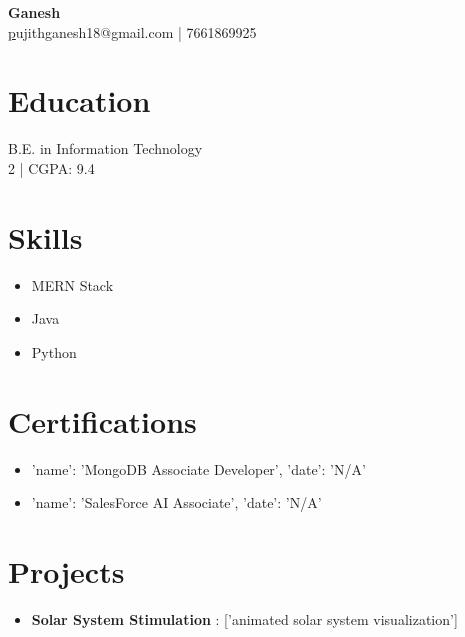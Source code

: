 \documentclass{article}
\begin{document}
\begin{center}
    {\LARGE \textbf{ Ganesh }} \\
    \href{mailto:pujithganesh18@gmail.com}pujithganesh18@gmail.com | 7661869925
\end{center}

\vspace{0.3cm}

\section*{Education}
B.E. in Information Technology \\
2 | CGPA: 9.4


\section*{Skills}
\begin{itemize}[leftmargin=*]
    
        \item MERN Stack 
    
        \item Java 
    
        \item Python
    
\end{itemize}



\section*{Certifications}
\begin{itemize}[leftmargin=*]
    
        \item {'name': 'MongoDB Associate Developer', 'date': 'N/A'}
    
        \item {'name': 'SalesForce AI Associate', 'date': 'N/A'}
    
\end{itemize}



\section*{Projects}
\begin{itemize}[leftmargin=*]
    
        \item \textbf{ Solar System Stimulation }: ['animated solar system visualization']
    
\end{itemize}
\end{document}
